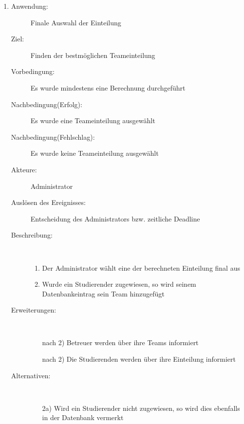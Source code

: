 \documentclass[parskip=full]{scrartcl}
\newcommand{\swtLabel}[1]{\textbf{/#1\arabic*0/}}
\begin{document}
\begin{enumerate} [label=\swtLabel{A}]
  
  \item
  \begin{description}
  \item[Anwendung:] Finale Auswahl der Einteilung
  \item[Ziel:] Finden der bestmöglichen Teameinteilung
  	\item[Vorbedingung:] Es wurde mindestens eine Berechnung durchgeführt
  	\item[Nachbedingung(Erfolg):] Es wurde eine Teameinteilung ausgewählt
  	\item[Nachbedingung(Fehlschlag):] Es wurde keine Teameinteilung ausgewählt
  	\item[Akteure:] Administrator
  	\item[Auslösen des Ereignisses:] Entscheidung des Administrators bzw.
  	zeitliche Deadline
  	\item[Beschreibung:]~
  	\begin{enumerate} 
  	  \item Der Administrator wählt eine der berechneten Einteilung final aus
  	  \item Wurde ein Studierender zugewiesen, so wird seinem Datenbankeintrag
  	  sein Team hinzugefügt
  	\end{enumerate}
  	\item[Erweiterungen:]~
  	\begin{enumerate}
  	  \item[nach 2)] Betreuer werden über ihre Teams informiert
  	  \item[nach 2)] Die Studierenden werden über ihre Einteilung informiert
  	 \end{enumerate}
  	\item[Alternativen:] ~
  	\begin{enumerate}
  	  \item[2a)] Wird ein Studierender nicht zugewiesen, so wird dies ebenfalls
  	  in der Datenbank vermerkt
  	 \end{enumerate}  
  \end{description}
   

\end{enumerate}
\end{document}
